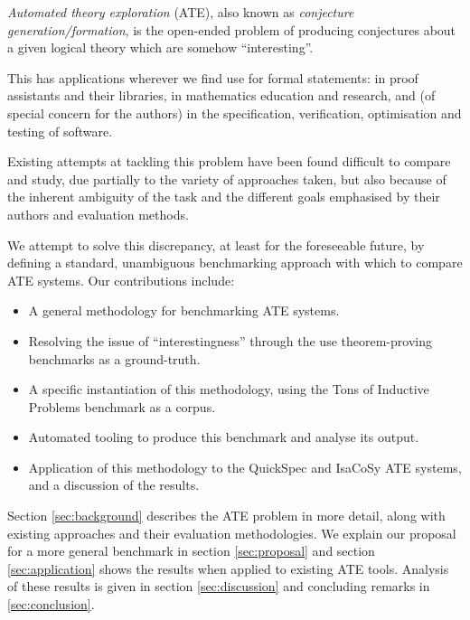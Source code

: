 
\emph{Automated theory exploration} (ATE), also known as
\emph{conjecture generation/formation}, is the open-ended problem of producing
conjectures about a given logical theory which are somehow ``interesting''.

This has applications wherever we find use for formal statements: in proof
assistants and their libraries, in mathematics education and research, and
(of special concern for the authors) in the specification, verification,
optimisation and testing of software.

Existing attempts at tackling this problem have been found difficult to compare
and study, due partially to the variety of approaches taken, but also because of
the inherent ambiguity of the task and the different goals emphasised by their
authors and evaluation methods.

We attempt to solve this discrepancy, at least for the foreseeable future, by
defining a standard, unambiguous benchmarking approach with which to compare
ATE systems. Our contributions include:

\begin{itemize}
\item A general methodology for benchmarking ATE systems.
\item Resolving the issue of ``interestingness'' through the use theorem-proving
  benchmarks as a ground-truth.
\item A specific instantiation of this methodology, using the Tons of Inductive
  Problems benchmark as a corpus.
\item Automated tooling to produce this benchmark and analyse its output.
\item Application of this methodology to the QuickSpec and IsaCoSy ATE systems,
  and a discussion of the results.
\end{itemize}

Section \ref{sec:background} describes the ATE problem in more detail, along
with existing approaches and their evaluation methodologies. We explain our
proposal for a more general benchmark in section \ref{sec:proposal} and
section \ref{sec:application} shows the results when applied to existing ATE tools.
Analysis of these results is given in section \ref{sec:discussion} and
concluding remarks in \ref{sec:conclusion}.


